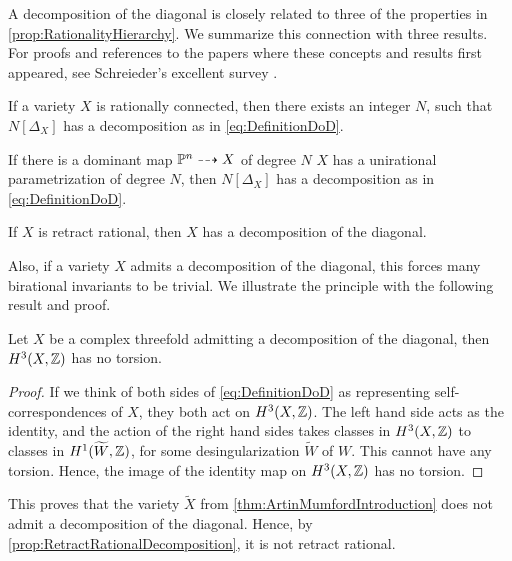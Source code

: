 A decomposition of the diagonal is closely related to three of the properties in \cref{prop:RationalityHierarchy}. We summarize this connection with three results. For proofs and references to the papers where these concepts and results first appeared, see Schreieder's excellent survey \cite{SchreiederCyclesAndRationality}.
\begin{proposition}
	If a variety $X$ is rationally connected, then there exists an integer $N$, such that $N[\Delta_X]$ has a decomposition as in \eqref{eq:DefinitionDoD}.
\end{proposition}
%

\begin{proposition}
	If there is a dominant map $\mathbb{P}^n \dashrightarrow X$ of degree $N$ \ie $X$ has a unirational parametrization of degree $N$, then $N[\Delta_X]$ has a decomposition as in \eqref{eq:DefinitionDoD}.
\end{proposition}

\begin{proposition}
	\label{prop:RetractRationalDecomposition}
	If $X$ is retract rational, then $X$ has a decomposition of the diagonal.
\end{proposition}

Also, if a variety $X$ admits a decomposition of the diagonal, this forces many birational invariants to be trivial. We illustrate the principle with the following result and proof.
\begin{proposition}
	\label{thm:DecompositionAndH3}
	Let $X$ be a complex threefold admitting a decomposition of the diagonal, then $H^3(X,\mathbb{Z})$ has no torsion.
\end{proposition}
\begin{proof}
	If we think of both sides of \eqref{eq:DefinitionDoD} as representing self-correspondences of $X$, they both act on $H^3(X,\mathbb{Z})$. The left hand side acts as the identity, and the action of the right hand sides takes classes in $H^3(X,\mathbb{Z})$ to classes in $H^1(\widetilde{W},\mathbb{Z})$, for some desingularization $\widetilde{W}$ of $W$. This cannot have any torsion. Hence, the image of the identity map on $H^3(X,\mathbb{Z})$ has no torsion.
\end{proof}
This proves that the variety $\widetilde{X}$ from \cref{thm:ArtinMumfordIntroduction} does not admit a decomposition of the diagonal. Hence, by \cref{prop:RetractRationalDecomposition}, it is not retract rational.

